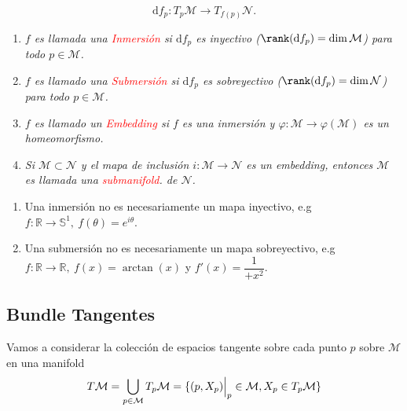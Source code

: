 \documentclass[../main]{subfiles}
\begin{document}
\begin{equation}
    \mathrm{d}f_p: T_p\mathcal{M}\rightarrow T_{f(p)}\mathcal{N}.
\end{equation}

\begin{enumerate}
    \item \textit{$f$ es llamada una \textcolor{red}{Inmersión} si $\mathrm{d}f_p$ es inyectivo ($\rank(\mathrm{d} f_p)=\dim \mathcal{M}$) para todo $p\in \mathcal{M}$.}
    \item \textit{$f$ es llamado una \textcolor{red}{Submersión} si $\mathrm{d}f_p$ es sobreyectivo ($\rank(\mathrm{d} f_p)=\dim \mathcal{N}$) para todo $p\in \mathcal{M}$.}
    \item \textit{$f$ es llamado un \textcolor{red}{Embedding} si $f$ es una inmersión y $\varphi: \mathcal{M}\rightarrow \varphi(\mathcal{M})$ es un homeomorfismo.}
    \item \textit{Si $\mathcal{M}\subset \mathcal{N}$ y el mapa de inclusión $i: \mathcal{M}\rightarrow \mathcal{N}$ es un embedding, entonces $\mathcal{M}$ es llamada una \textcolor{red}{submanifold}. de $\mathcal{N}$.}
\end{enumerate}

\boxed{\textcolor{red}{Nota}:}
\begin{enumerate}
    \item Una inmersión no es necesariamente un mapa inyectivo, e.g $f:\mathbb{R} \rightarrow \mathbb{S}^1,\ f(\theta)=e^{i\theta}$.
    \item Una submersión no es necesariamente un mapa sobreyectivo, e.g $f: \mathbb{R} \rightarrow \mathbb{R}, \ f(x)=\arctan(x)$ y $f'(x)=\dfrac{1}{+x^2}$.
\end{enumerate}

\subsection{Bundle Tangentes}
Vamos a considerar la colección de espacios tangente sobre cada punto $p$ sobre $\mathcal{M}$ en una manifold 
\begin{equation}
    T \mathcal{M}=\bigcup_{p \in \mathcal{M}} T_p \mathcal{M}=\{(p, X_p)\Big{|}_p \in \mathcal{M}, X_p \in T_p\mathcal{M}\}
\end{equation}
\end{document}
